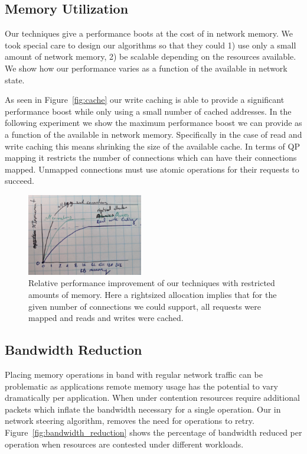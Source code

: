 
\subsection{Memory Utilization}

Our techniques give a performance boots at the cost of in network memory. We
took special care to design our algorithms so that they could 1) use only a
small amount of network memory, 2) be scalable depending on the resources
available. We show how our performance varies as a function of the available in
network state.

As seen in Figure~\ref{fig:cache} our write caching is able to provide a
significant performance boost while only using a small number of cached
addresses. In the following experiment we show the maximum performance boost we
can provide as a function of the available in network memory. Specifically in
the case of read and write caching this means shrinking the size of the
available cache. In terms of QP mapping it restricts the number of connections
which can have their connections mapped. Unmapped connections must use atomic
operations for their requests to succeed.

\begin{figure}
    \includegraphics[width=0.45\textwidth]{fig/memory_util.jpg}
    \caption{{Relative performance improvement of our techniques with restricted amounts of memory. Here a rightsized allocation implies that for the given number of connections we could support, all requests were mapped and reads and writes were cached.}}
    \label{fig:memory_util}
\end{figure}



\subsection{Bandwidth Reduction}

Placing memory operations in band with regular network traffic can be
problematic as applications remote memory usage has the potential to vary
dramatically per application. When under contention resources require additional
packets which inflate the bandwidth necessary for a single operation. Our in
network steering algorithm, removes the need for operations to retry.
Figure~\ref{fig:bandwidth_reduction} shows the percentage of bandwidth reduced
per operation when resources are contested under different workloads.

